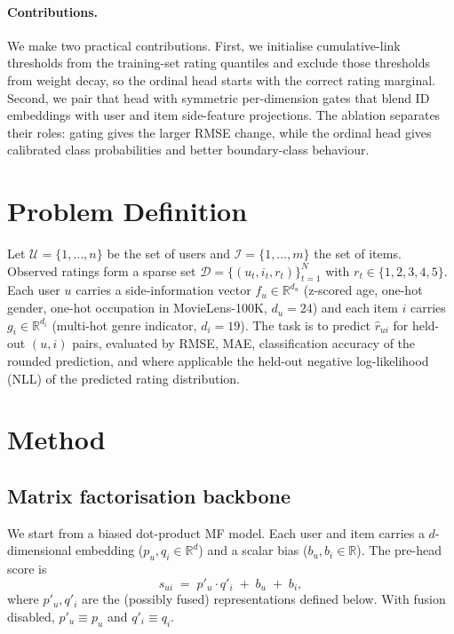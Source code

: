 \documentclass{article} %
\begin{document}
\paragraph{Contributions.}
We make two practical contributions. First, we initialise cumulative-link
thresholds from the training-set rating quantiles and exclude those thresholds
from weight decay, so the ordinal head starts with the correct rating
marginal. Second, we pair that head with symmetric per-dimension gates that
blend ID embeddings with user and item side-feature projections. The ablation
separates their roles: gating gives the larger RMSE change, while the ordinal
head gives calibrated class probabilities and better boundary-class behaviour.

\section{Problem Definition}
\label{sec:problem}

Let $\mathcal{U}=\{1,\dots,n\}$ be the set of users and $\mathcal{I}=\{1,\dots,m\}$
the set of items. Observed ratings form a sparse set
$\mathcal{D}=\{(u_t,i_t,r_t)\}_{t=1}^{N}$ with $r_t\in\{1,2,3,4,5\}$. Each user
$u$ carries a side-information vector $f_u\in\mathbb{R}^{d_u}$ (z-scored age,
one-hot gender, one-hot occupation in MovieLens-100K, $d_u=24$) and each
item $i$ carries $g_i\in\mathbb{R}^{d_i}$ (multi-hot genre indicator,
$d_i=19$). The task
is to predict $\hat r_{ui}$ for held-out $(u,i)$ pairs, evaluated by RMSE, MAE,
classification accuracy of the rounded prediction, and where applicable the
held-out negative log-likelihood (NLL) of the predicted rating distribution.

\section{Method}
\label{sec:method}

\subsection{Matrix factorisation backbone}
We start from a biased dot-product MF model. Each user and item carries a
$d$-dimensional embedding ($p_u, q_i\in\mathbb{R}^d$) and a scalar bias
($b_u, b_i\in\mathbb{R}$). The pre-head score is
\begin{equation}
\label{eq:score}
s_{ui} \;=\; p'_u \cdot q'_i \;+\; b_u \;+\; b_i,
\end{equation}
where $p'_u,q'_i$ are the (possibly fused) representations defined below. With
fusion disabled, $p'_u\equiv p_u$ and $q'_i\equiv q_i$.
\end{document}
